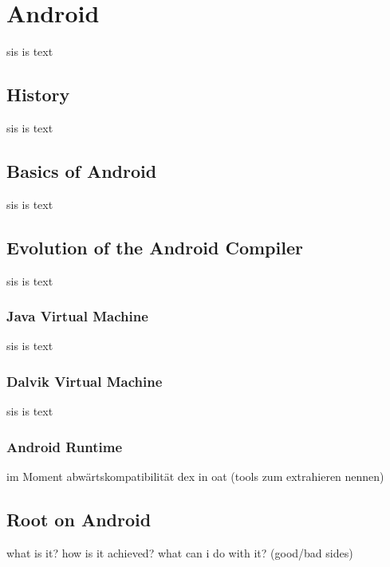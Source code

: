 \section{Android}\label{section:android}
sis is text
\subsection{History}\label{subsection:android-history}
sis is text
\subsection{Basics of Android}\label{subsection:android-basics}
sis is text
\subsection{Evolution of the Android Compiler}\label{subsection:android-evolution}
sis is text
\subsubsection{Java Virtual Machine}\label{subsubsection:android-evolution-jvm}
sis is text
\subsubsection{Dalvik Virtual Machine}\label{subsubsection:android-evolution-dvm}
sis is text
\subsubsection{Android Runtime}\label{subsubsection:android-evolution-art}
im Moment abwärtskompatibilität dex in oat (tools zum extrahieren nennen)
\subsection{Root on Android}\label{subsection:android-root}
what is it? how is it achieved? what can i do with it? (good/bad sides)

